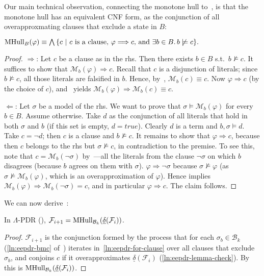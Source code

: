 \documentclass[acmsmall,screen]{acmart}
\renewcommand{\implies}{\Longrightarrow}
\newcommand{\true}{{\textit{true}}}
\newcommand{\tr}{\delta}
\newcommand{\Frame}{\mathcal{F}}
\newcommand{\set}[1]{\{{#1}\}}
\newcommand{\reflextr}[1]{\underline{#1}}
\newcommand{\postimage}[2]{{\reflextr{#1}}({#2})}
\newcommand{\bkwrch}[1]{\mathcal{B}_{#1}}
\newcommand{\monox}[2]{\mathcal{M}_{#2}({#1})}
\newcommand{\mhull}[2]{{\rm MHull}_{#2}({#1})}
\begin{document}
%
Our main technical observation, connecting the monotone hull to~, is that the monotone hull has an equivalent CNF form, as the conjunction of all overapproxmating clauses that exclude a state in $B$:
\begin{theorem}
\label{thm:mhull-conjunctive}
\label{lem:monox-conjunction-clauses}
	$\mhull{\varphi}{B} \equiv \bigwedge{\set{c \ | \ \mbox{$c$ is a clause, } \varphi \implies c \mbox{, and } \exists b \in B. \, b \not\models c}}.$
\end{theorem}
\begin{proof}
\noindent
$\Longrightarrow$: Let $c$ be a clause as in the rhs. Then there exists $b \in B$ s.t.\ $b \not\models c$. It suffices to show that $\monox{\varphi}{b} \implies c$. Recall that $c$ is a disjunction of literals; since $b \not\models c$, all those literals are falsified in $b$. Hence, by~, $\monox{c}{b} \equiv c$.
Now $\varphi \implies c$ (by the choice of $c$), and~ yields $\monox{\varphi}{b} \implies \monox{c}{b} \equiv c$.

\noindent
$\Longleftarrow$:
Let $\sigma$ be a model of the rhs. We want to prove that $\sigma \models \monox{\varphi}{b}$ for every $b \in B$.
Assume otherwise.
Take $d$ as the conjunction of all literals that hold in both $\sigma$ and $b$ (if this set is empty, $d=\true$). Clearly $d$ is a term and $b,\sigma \models d$.
Take $c = \neg d$; then $c$ is a clause and $b \not\models c$.
It remains to show that $\varphi \implies c$, because then $c$ belongs to the rhs but $\sigma \not\models c$, in contradiction to the premise.
To see this, note that $c = \monox{\neg \sigma}{b}$ by~---all the literals from the clause $\neg \sigma$ on which $b$ disagrees (because $b$ agrees on them with $\sigma$).
$\varphi \implies \neg \sigma$ because $\sigma \not\models \varphi$ (as $\sigma \not\models \monox{\varphi}{b}$, which is an overapproximation of $\varphi$). Hence  implies $\monox{\varphi}{b} \implies \monox{\neg \sigma}{b} = c$, and in particular $\varphi \implies c$. The claim follows.
%
%
%
%
%
%
%
%
%
%
%
%
%
\end{proof}
We can now derive~:
\begin{corollary}
\label{lem:justify-overview-next-frame}
In $\Lambda$-PDR (), $\Frame_{i+1} = \mhull{\postimage{\tr}{\Frame_i}}{\bkwrch{k}}$.
\end{corollary}
\begin{proof}
$\Frame_{i+1}$ is the conjunction formed by the process that for each $\sigma_b \in \bkwrch{k}$ (\cref{ln:eepdr-bmc} of~) iterates in~\cref{ln:eepdr-for-clause} over all clauses that exclude $\sigma_b$, and conjoins $c$ if it overapproximates $\postimage{\tr}{\Frame_i}$ (\cref{ln:eepdr-lemma-check}). By~ this is $\mhull{\postimage{\tr}{\Frame_i}}{\bkwrch{k}}$.
\end{proof}
\end{document}
